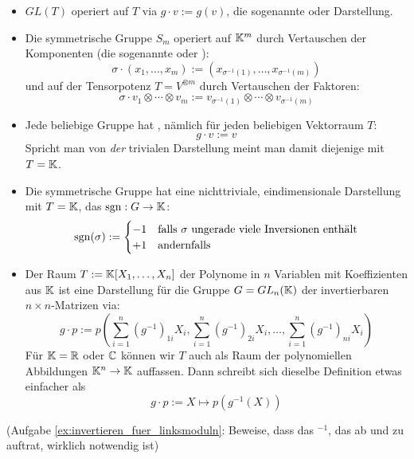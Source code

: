 \begin{example}
\begin{itemize}
\item $GL(T)$ operiert auf $T$ via $g\cdot v := g(v)$, die sogenannte  oder  Darstellung.
\item Die symmetrische Gruppe $S_m$ operiert auf $\mathbb{K}^m$ durch Vertauschen der Komponenten (die sogenannte  oder ):
\[\sigma \cdot (x_1,\ldots,x_m) := (x_{\sigma^{-1}(1)}, \ldots, x_{\sigma^{-1}(m)})\]
und auf der Tensorpotenz $T=V^{\otimes m}$ durch Vertauschen der Faktoren:
\[\sigma \cdot v_1\otimes\cdots\otimes v_m := v_{\sigma^{-1}(1)}\otimes \cdots \otimes v_{\sigma^{-1}(m)} \]
\item Jede beliebige Gruppe hat , nämlich für jeden beliebigen Vektorraum $T$:
\[g\cdot v := v\]
Spricht man von \emph{der} trivialen Darstellung meint man damit diejenige mit $T=\mathbb{K}$.
\item Die symmetrische Gruppe hat eine nichttriviale, eindimensionale Darstellung mit $T=\mathbb{K}$, das  $\operatorname{sgn}: G\to\mathbb{K}$:
\[\operatorname{sgn}(\sigma) := \begin{cases} -1 & \text{falls $\sigma$ ungerade viele Inversionen enthält} \\ +1 & \text{andernfalls}\end{cases}\]
\item Der Raum $T:=\mathbb{K}[X_1, \ldots, X_n]$ der Polynome in $n$ Variablen mit Koeffizienten aus $\mathbb{K}$ ist eine Darstellung für die Gruppe $G=GL_n(\mathbb{K})$ der invertierbaren $n\times n$-Matrizen via:
\[g\cdot p := p\left(\sum_{i=1}^n (g^{-1})_{1i} X_i, \sum_{i=1}^n (g^{-1})_{2i} X_i, \ldots, \sum_{i=1}^n (g^{-1})_{ni} X_i\right)\]
Für $\mathbb{K}=\mathbb{R}$ oder $\mathbb{C}$ können wir $T$ auch als Raum der polynomiellen Abbildungen $\mathbb{K}^n \to \mathbb{K}$ auffassen. Dann schreibt sich dieselbe Definition etwas einfacher als
\[g \cdot p := X\mapsto p(g^{-1}(X))\]
\end{itemize}
(Aufgabe \ref{ex:invertieren_fuer_linksmoduln}: Beweise, dass das $^{-1}$, das ab und zu auftrat, wirklich notwendig ist)
\end{example}

